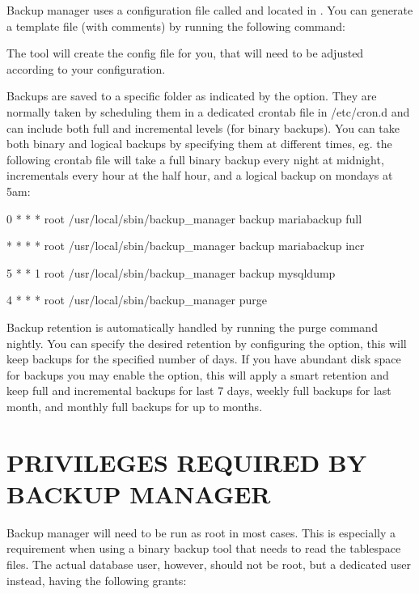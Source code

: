 \documentclass[letterpaper,10pt,english]{sphinxmanual}
\begin{document}
\sphinxAtStartPar
Backup manager uses a configuration file called  and located
in . You can generate a template file (with comments) by running
the following command:

\sphinxAtStartPar
{}

\sphinxAtStartPar
The tool will create the config file for you, that will need to be adjusted
according to your configuration.

\sphinxAtStartPar
Backups are saved to a specific folder as indicated by the  option.
They are normally taken by scheduling them in a dedicated crontab file in /etc/cron.d
and can include both full and incremental levels (for binary backups). You can take
both binary and logical backups by specifying them at different times, eg. the
following crontab file will take a full binary backup every night at midnight,
incrementals every hour at the half hour, and a logical backup on mondays at 5am:

 0 * * * root /usr/local/sbin/backup\_manager backup mariabackup full

 * * * * root /usr/local/sbin/backup\_manager backup mariabackup incr

 5 * * 1 root /usr/local/sbin/backup\_manager backup mysqldump

 4 * * * root /usr/local/sbin/backup\_manager purge

\sphinxAtStartPar
Backup retention is automatically handled by running the purge command nightly.
You can specify the desired retention by configuring the  option, this will
keep backups for the specified number of days. If you have abundant disk space for
backups you may enable the  option, this will apply a smart retention
and keep full and incremental backups for last 7 days, weekly full backups for
last month, and monthly full backups for up to  months.


\section{PRIVILEGES REQUIRED BY BACKUP MANAGER}
\label{\detokenize{mariadb-backup-manager:privileges-required-by-backup-manager}}
\sphinxAtStartPar
Backup manager will need to be run as root in most cases. This is especially a
requirement when using a binary backup tool that needs to read the tablespace files.
The actual database user, however, should not be root, but a dedicated user instead,
having the following grants:
\end{document}
